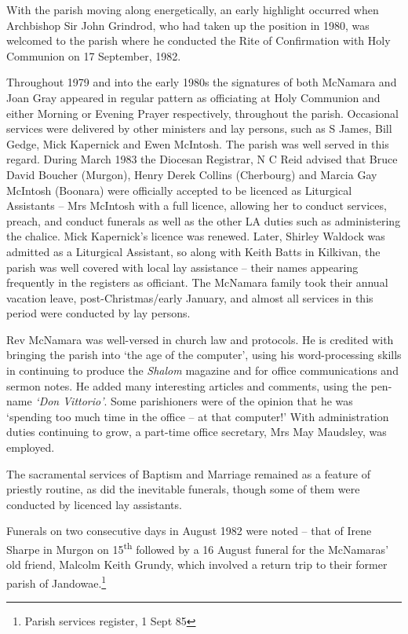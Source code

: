With the parish moving along energetically, an early highlight occurred
when Archbishop Sir John Grindrod, who had taken up the position in
1980, was welcomed to the parish where he conducted the Rite of
Confirmation with Holy Communion on 17 September, 1982.

Throughout 1979 and into the early 1980s the signatures of both McNamara
and Joan Gray appeared in regular pattern as officiating at Holy
Communion and either Morning or Evening Prayer respectively, throughout
the parish. Occasional services were delivered by other ministers and
lay persons, such as S James, Bill Gedge, Mick Kapernick and Ewen
McIntosh. The parish was well served in this regard. During March 1983
the Diocesan Registrar, N C Reid advised that Bruce David Boucher
(Murgon), Henry Derek Collins (Cherbourg) and Marcia Gay McIntosh
(Boonara) were officially accepted to be licenced as Liturgical
Assistants -- Mrs McIntosh with a full licence, allowing her to conduct
services, preach, and conduct funerals as well as the other LA duties
such as administering the chalice. Mick Kapernick's licence was renewed.
Later, Shirley Waldock was admitted as a Liturgical Assistant, so along
with Keith Batts in Kilkivan, the parish was well covered with local lay
assistance -- their names appearing frequently in the registers as
officiant. The McNamara family took their annual vacation leave,
post-Christmas/early January, and almost all services in this period
were conducted by lay persons.

Rev McNamara was well-versed in church law and protocols. He is credited
with bringing the parish into `the age of the computer', using his
word-processing skills in continuing to produce the \emph{Shalom}
magazine and for office communications and sermon notes. He added many
interesting articles and comments, using the pen-name \emph{`Don
Vittorio'}. Some parishioners were of the opinion that he was `spending
too much time in the office -- at that computer!' With administration
duties continuing to grow, a part-time office secretary, Mrs May
Maudsley, was employed.

The sacramental services of Baptism and Marriage remained as a feature
of priestly routine, as did the inevitable funerals, though some of them
were conducted by licenced lay assistants.

Funerals on two consecutive days in August 1982 were noted -- that of
Irene Sharpe in Murgon on 15\textsuperscript{th} followed by a 16 August
funeral for the McNamaras' old friend, Malcolm Keith Grundy, which
involved a return trip to their former parish of Jandowae.\footnote{Parish
  services register, 1 Sept 85}

